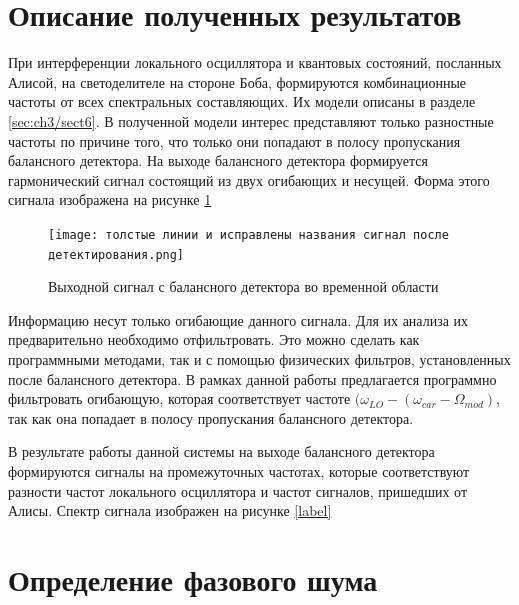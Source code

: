 \section{Описание полученных результатов}\label{sec:ch3/sect8}
При интерференции локального осциллятора и квантовых состояний, посланных Алисой, на светоделителе на стороне Боба, формируются комбинационные частоты от всех спектральных составляющих. Их модели описаны в разделе \ref*{sec:ch3/sect6}.
В полученной модели интерес представляют только разностные частоты по причине того, что только они попадают в полосу пропускания балансного детектора.
На выходе балансного детектора формируется гармонический сигнал состоящий из двух огибающих и несущей. Форма этого сигнала изображена на рисунке \ref*{fig: het true time}
\begin{figure}
    \centering
    \texttt{[image: толстые линии и исправлены названия сигнал после детектирования.png]}
    \caption*{Выходной сигнал с балансного детектора во временной области}
    \label{fig: het true time}
\end{figure}
Информацию несут только огибающие данного сигнала. Для их анализа их предварительно необходимо отфильтровать. Это можно сделать как программными методами, так и с помощью физических фильтров, установленных после балансного детектора.
В рамках данной работы предлагается программно фильтровать огибающую, которая соответствует частоте $(\omega_{LO} -(\omega_{car} - \Omega_{mod})$, так как она попадает в полосу пропускания балансного детектора. 

В результате работы данной системы на выходе балансного детектора формируются сигналы на промежуточных частотах, которые соответствуют разности частот локального осциллятора и частот сигналов, пришедших от Алисы. Спектр сигнала изображен на рисунке \ref*{label}

\section{Определение фазового шума}\label{sec:ch3/sect9}

